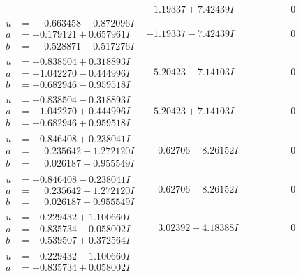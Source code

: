 \documentclass[1p]{elsarticle_modified}
\theoremstyle{definition}
\begin{document}
$$\begin{array}{c|c|c}
 & -1.19337 + 7.42439 I & \phantom{-0.000000 } 0 \\ \hline\begin{aligned}
u &= \phantom{-}0.663458 - 0.872096 I \\
a &= -0.179121 + 0.657961 I \\
b &= \phantom{-}0.528871 - 0.517276 I\end{aligned}
 & -1.19337 - 7.42439 I & \phantom{-0.000000 } 0 \\ \hline\begin{aligned}
u &= -0.838504 + 0.318893 I \\
a &= -1.042270 - 0.444996 I \\
b &= -0.682946 - 0.959518 I\end{aligned}
 & -5.20423 - 7.14103 I & \phantom{-0.000000 } 0 \\ \hline\begin{aligned}
u &= -0.838504 - 0.318893 I \\
a &= -1.042270 + 0.444996 I \\
b &= -0.682946 + 0.959518 I\end{aligned}
 & -5.20423 + 7.14103 I & \phantom{-0.000000 } 0 \\ \hline\begin{aligned}
u &= -0.846408 + 0.238041 I \\
a &= \phantom{-}0.235642 + 1.272120 I \\
b &= \phantom{-}0.026187 + 0.955549 I\end{aligned}
 & \phantom{-}0.62706 + 8.26152 I & \phantom{-0.000000 } 0 \\ \hline\begin{aligned}
u &= -0.846408 - 0.238041 I \\
a &= \phantom{-}0.235642 - 1.272120 I \\
b &= \phantom{-}0.026187 - 0.955549 I\end{aligned}
 & \phantom{-}0.62706 - 8.26152 I & \phantom{-0.000000 } 0 \\ \hline\begin{aligned}
u &= -0.229432 + 1.100660 I \\
a &= -0.835734 - 0.058002 I \\
b &= -0.539507 + 0.372564 I\end{aligned}
 & \phantom{-}3.02392 - 4.18388 I & \phantom{-0.000000 } 0 \\ \hline\begin{aligned}
u &= -0.229432 - 1.100660 I \\
a &= -0.835734 + 0.058002 I \\

\end{aligned}
\end{array}$$
\end{document}

